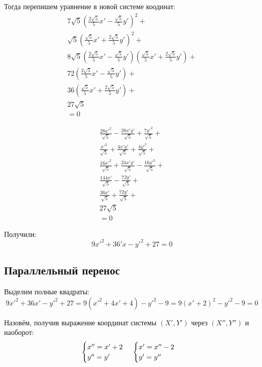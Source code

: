 \documentclass[12pt, a4paper]{article}
\begin{document}
    Тогда перепишем уравнение в новой системе коодинат:
    \begin{multline}
        7\sqrt{5} \left(\frac{2\sqrt{5}}{5} x' - \frac{\sqrt{5}}{5} y'\right)^2 + \\
        \sqrt{5} \left(\frac{\sqrt{5}}{5} x' + \frac{2\sqrt{5}}{5} y'\right)^2 + \\
        8\sqrt{5} \left(\frac{2\sqrt{5}}{5} x' - \frac{\sqrt{5}}{5} y'\right)\left(\frac{\sqrt{5}}{5} x' + \frac{2\sqrt{5}}{5} y'\right) + \\
        72 \left(\frac{2\sqrt{5}}{5} x' - \frac{\sqrt{5}}{5} y'\right) + \\
        36 \left(\frac{\sqrt{5}}{5} x' + \frac{2\sqrt{5}}{5} y' \right) + \\
        27\sqrt{5} \\
        = 0
    \end{multline}

    \begin{multline}
        \frac{28 x'^2}{\sqrt{5}} - \frac{28 x' y'}{\sqrt{5}} + \frac{7 y'^2}{\sqrt{5}} + \\
        \frac{x'^2}{\sqrt{5}} + \frac{4 x' y'}{\sqrt{5}} + \frac{4 y'^2}{\sqrt{5}} + \\
        \frac{16 x'^2}{\sqrt{5}} + \frac{24 x' y'}{\sqrt{5}} - \frac{16 y'^2}{\sqrt{5}} + \\
        \frac{144 x'}{\sqrt{5}} - \frac{72 y'}{\sqrt{5}} + \\
        \frac{36 x'}{\sqrt{5}} + \frac{72 y'}{\sqrt{5}} + \\
        27\sqrt{5} \\
        = 0
    \end{multline}

    Получили:
    \begin{equation}
        9x'^2 + 36'x - y'^2 + 27 = 0
    \end{equation}

    \subsection{Параллельный перенос}

    Выделим полные квадраты:
    \begin{equation}
        9x'^2 + 36x' - y'^2 + 27 = 9(x'^2 + 4x' + 4) - y'^2 - 9 = 9(x' + 2)^2 - y'^2 - 9 = 0
    \end{equation}
    
    Назовём, получив выражение координат системы $(X', Y')$ через $(X'', Y'')$ и наоборот:
    \begin{equation}
        \begin{cases}
            x'' = x' + 2 \\
            y'' = y'
        \end{cases} \\
        \begin{cases}
            x' = x'' - 2 \\
            y' = y''
        \end{cases}
    \end{equation}
    
\end{document}

